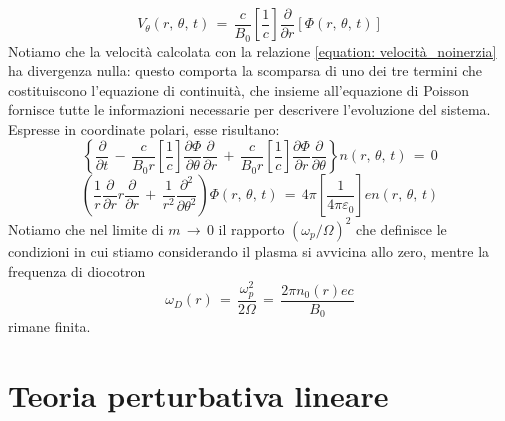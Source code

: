 \begin{equation}
    V_\theta\left(r,\,\theta,\,t\right)\,=\,\frac{c}{B_0}\left[\frac{1}{c}\right]\frac{\partial}{\partial r}\left[\Phi\left(r,\,\theta,\,t\right)\right]
\end{equation}
Notiamo che la velocità calcolata con la relazione \eqref{equation: velocità_noinerzia} ha divergenza nulla: questo comporta la scomparsa di 
uno dei tre termini che costituiscono l'equazione di continuità, che insieme all'equazione di Poisson fornisce tutte le informazioni necessarie 
per descrivere l'evoluzione del sistema. Espresse in coordinate polari, esse risultano:
\begin{equation}
    \left\{\frac{\partial}{\partial t}\,-\,\frac{c}{B_0 r}\left[\frac{1}{c}\right]\frac{\partial \Phi}{\partial \theta}\frac{\partial}{\partial r}\,+\,\frac{c}{B_0 r}\left[\frac{1}{c}\right]\frac{\partial \Phi}{\partial r}\frac{\partial}{\partial \theta}\right\} n\left(r,\,\theta,\,t\right)\,=\,0
    \label{equation: continuità_no_inerziapol}
\end{equation}
\begin{equation}
    \left(\frac{1}{r}\frac{\partial}{\partial r}r\frac{\partial}{\partial r}\,+\,\frac{1}{r^2}\frac{\partial^2}{\partial \theta^2}\right)\Phi\left(r,\,\theta,\,t\right)\,=\,4\pi \left[\frac{1}{4\pi\varepsilon_0}\right]e n\left(r,\,\theta,\,t\right)
    \label{equation: poisson_no_inerziapol}
\end{equation}
Notiamo che nel limite di $m\,\rightarrow\,0$ il rapporto $\left(\omega_p/\Omega\right)^2$ che definisce le condizioni in cui stiamo considerando 
il plasma si avvicina allo zero, mentre la frequenza di diocotron
\begin{equation}
    \omega_D\left(r\right)\,=\,\frac{\omega_p^2}{2\Omega}\,=\,\frac{2\pi n_0\left(r\right)ec}{B_0}
    \label{equation: diocotron_freq}
\end{equation}
rimane finita.

\section{Teoria perturbativa lineare}

